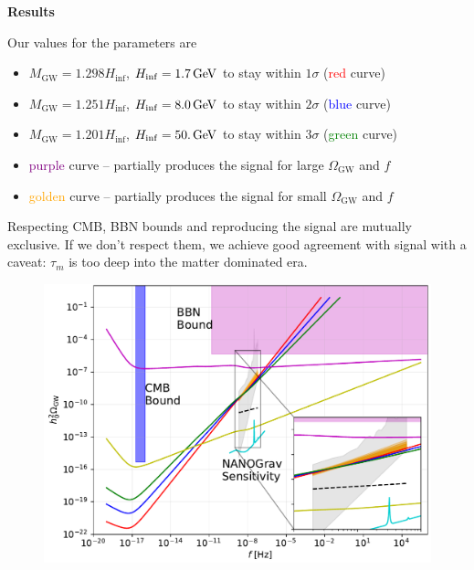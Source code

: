 \documentclass{beamer}                             %
\newcommand{\blocktitle}[1]{{\Large \textbf{#1}}}
\newcommand{\GeV}{\,{\rm GeV}}
\begin{document}
\begin{frame}[t]
\begin{columns}[T]
\begin{column}{0.30\textwidth}
    \begin{tcolorbox}
    \blocktitle{Results}
    
    Our values for the parameters are 
    \begin{itemize}
        \item $M_{\text{GW}} = 1.298H_{\inf}$, $H_{\inf} =  1.7 \GeV$ to stay within $1\sigma$ (\textcolor{red}{red} curve)
        \item $M_{\text{GW}} = 1.251H_{\inf}$, $H_{\inf} = 8.0 \GeV$ to stay within $2\sigma$ (\textcolor{blue}{blue} curve)
        \item $M_{\text{GW}} = 1.201H_{\inf}$, $H_{\inf} = 50. \GeV$ to stay within $3\sigma$ (\textcolor{green}{green} curve)
        \item \textcolor{purple}{purple} curve -- partially produces the signal for large $\Omega_{\text{GW}}$ and $f$
        \item \textcolor{orange}{golden} curve -- partially produces the signal for small $\Omega_{\text{GW}}$ and $f$
    \end{itemize}
   Respecting CMB, BBN bounds and reproducing the signal are mutually exclusive. If we don't respect them, we achieve good agreement with signal with a caveat: $\tau_m$ is too deep into the matter dominated era.
   \vspace{-0cm}
     \begin{figure}[t]
        \centering
          \includegraphics[width=.89\linewidth]{fig5.pdf} 
          \label{fig:gwb}
        \end{figure}
  \end{tcolorbox}
  
\end{column}


\end{columns}
\end{frame}
\end{document}
